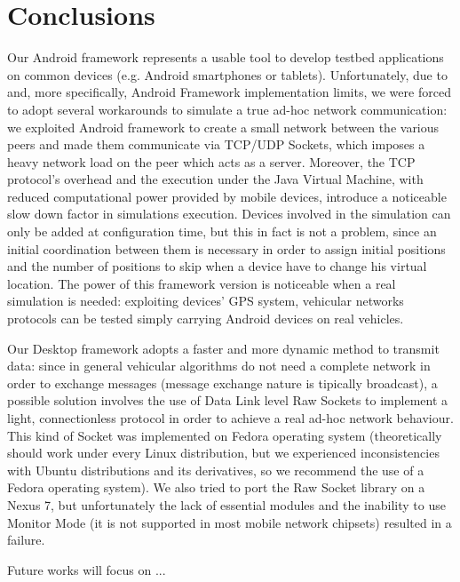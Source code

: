 \newpage
\section{Conclusions}

	Our Android framework represents a usable tool to develop testbed applications on common devices (e.g. Android smartphones or tablets). Unfortunately, due to \direct and, more specifically, Android \direct Framework implementation limits, we were forced to adopt several workarounds to simulate a true ad-hoc network communication: we exploited Android \direct framework to create a small network between the various peers and made them communicate via TCP/UDP Sockets, which imposes a heavy network load on the peer which acts as a server. Moreover, the TCP protocol's overhead and the execution under the Java Virtual Machine, with reduced computational power provided by mobile devices, introduce a noticeable slow down factor in simulations execution. 
	Devices involved in the simulation can only be added at configuration time, but this in fact is not a problem, since an initial coordination between them is necessary in order to assign initial positions and the number of positions to skip when a device have to change his virtual location. 
	The power of this framework version is noticeable when a real simulation is needed: exploiting devices' GPS system, vehicular networks protocols can be tested simply carrying Android devices on real vehicles. 
	
	Our Desktop framework adopts a faster and more dynamic method to transmit data: since in general vehicular algorithms do not need a complete network in order to exchange messages (message exchange nature is tipically broadcast), a possible solution involves the use of Data Link level Raw Sockets to implement a light, connectionless protocol in order to achieve a real ad-hoc network behaviour.%
	This kind of Socket was implemented on Fedora operating system (theoretically should work under every Linux distribution, but we experienced inconsistencies with Ubuntu distributions and its derivatives, so we recommend the use of a Fedora operating system). We also tried to port the Raw Socket library on a Nexus 7, but unfortunately the lack of essential modules and the inability to use Monitor Mode (it is not supported in most mobile network chipsets) resulted in a failure. 
	
	Future works will focus on ...  

